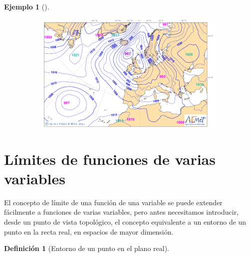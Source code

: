 \documentclass[
  a4paper,
]{scrreport}
\theoremstyle{definition}
\newtheorem{example}{Ejemplo}[chapter]
\theoremstyle{plain}
\theoremstyle{definition}
\newtheorem{definition}{Definición}[chapter]
\theoremstyle{definition}
\theoremstyle{plain}
\theoremstyle{plain}
\theoremstyle{remark}
\begin{document}
\begin{example}[]
\begin{figure}
\begin{minipage}{0.50\linewidth}
\begin{figure}[H]
{}


\end{figure}%

\end{minipage}%
%
\begin{minipage}{0.50\linewidth}

\begin{figure}[H]

{\centering \includegraphics{./img/derivadas-funciones-varias-variables/mapa-isobaras.jpg}

}


\end{figure}%

\end{minipage}%

\end{figure}%

\section{Límites de funciones de varias
variables}\label{luxedmites-de-funciones-de-varias-variables}

El concepto de límite de una función de una variable se puede extender
fácilmente a funciones de varias variables, pero antes necesitamos
introducir, desde un punto de vista topológico, el concepto equivalente
a un entorno de un punto en la recta real, en espacios de mayor
dimensión.

\begin{definition}[Entorno de un punto en el plano
real]\protect\hypertarget{def-entorno-punto-plano}{}\label{def-entorno-punto-plano}


\end{definition}
\end{example}
\end{document}
